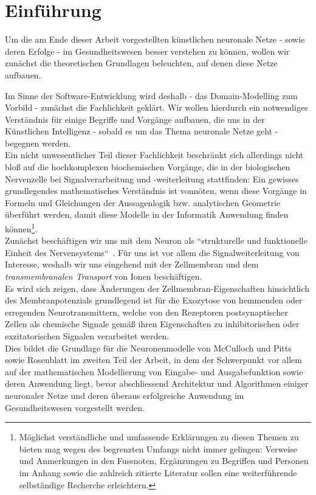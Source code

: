\chapter{Einführung}

Um die am Ende dieser Arbeit vorgestellten künstlichen neuronale Netze - sowie deren Erfolge - im Gesundheitswesen besser verstehen zu können, wollen wir zunächst die theoretischen Grundlagen beleuchten, auf denen diese Netze aufbauen.

Im Sinne der Software-Entwicklung wird deshalb - das Domain-Modelling zum Vorbild - zunächst die Fachlichkeit geklärt.
Wir wollen hierdurch ein notwendiges Verständnis für einige Begriffe und Vorgänge aufbauen, die uns in der Künstlichen Intelligenz - sobald es um das Thema neuronale Netze geht - begegnen werden. \\

Ein nicht unwesentlicher Teil dieser Fachlichkeit beschränkt sich allerdings nicht bloß auf die hochkomplexen biochemischen Vorgänge, die in der biologischen Nervenzelle bei Signalverarbeitung und -weiterleitung stattfinden: Ein gewisses grundlegendes mathematisches Verständnis ist vonnöten, wenn diese Vorgänge in Formeln und Gleichungen der Aussagenlogik {bzw.} analytischen Geometrie überführt werden, damit diese Modelle in der Informatik Anwendung finden können\footnote{
    Möglichst verständliche und umfassende Erklärungen zu diesen Themen zu bieten mag wegen des begrenzten Umfangs nicht immer gelingen: Verweise und Anmerkungen in den Fussnoten, Ergänzungen zu Begriffen und Personen im Anhang sowie die zahlreich zitierte Literatur sollen eine weiterführende selbständige Recherche erleichtern.
}.\\

Zunächst beschäftigen wir uns mit dem Neuron als ``strukturelle und funktionelle Einheit des Nervensystems``~\cite[42]{SD07}.
Für uns ist vor allem die Signalweiterleitung von Interesse, weshalb wir uns eingehend mit der Zellmembran und dem \textit{transmembranalen Transport} von Ionen beschäftigen.\\

Es wird sich zeigen, dass Änderungen der Zellmembran-Eigenschaften hinsichtlich des Membranpotenzials grundlegend ist für die Exozytose von hemmenden oder erregenden Neurotransmittern, welche von den Rezeptoren postsynaptischer Zellen als chemische Signale gemäß ihren Eigenschaften zu inhibitorischen oder exzitatorischen Signalen verarbeitet werden.\\

Dies bildet die Grundlage für die Neuronenmodelle von McCulloch und Pitts sowie Rosenblatt im zweiten Teil der Arbeit, in dem der Schwerpunkt vor allem auf der mathematischen Modellierung von Eingabe- und Ausgabefunktion sowie deren Anwendung liegt, bevor abschliessend Architektur und Algorithmen einiger neuronaler Netze und deren überaus erfolgreiche Anwendung im Gesundheitswesen vorgestellt werden.